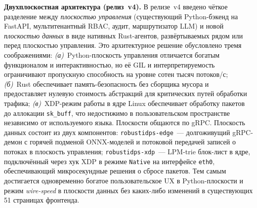 \noindent\textbf{Двухплоскостная архитектура (релиз~v4).} В
релизе~v4 введено чёткое разделение между \emph{плоскостью
управления} (существующий Python-бэкенд на FastAPI,
мультитенантный RBAC, аудит, маршрутизатор LLM) и новой
\emph{плоскостью данных} в виде нативных Rust-агентов,
развёртываемых рядом или перед плоскостью управления. Это
архитектурное решение обусловлено тремя соображениями:
\emph{(а)}~Python-плоскость управления отличается богатым
функционалом и интерактивностью, но её GIL и интерпретируемость
ограничивают пропускную способность на уровне сотен тысяч
потоков/с; \emph{(б)}~Rust обеспечивает память-безопасность без
сборщика мусора и предоставляет нулевую стоимость абстракций для
критических путей обработки трафика; \emph{(в)}~XDP-режим
работы в ядре Linux обеспечивает обработку пакетов до
аллокации \texttt{sk\_buff}, что недостижимо в пользовательском
пространстве независимо от используемого языка. Плоскости
общаются по gRPC. Плоскость данных состоит из двух компонентов:
\texttt{robustidps-edge}~--- долгоживущий gRPC-демон с горячей
подменой ONNX-моделей и потоковой передачей записей о потоках в
плоскость управления; \texttt{robustidps-xdp}~--- LPM-trie блок-лист
в ядре, подключённый через хук XDP в режиме \texttt{Native} на
интерфейсе \texttt{eth0}, обеспечивающий микросекундные решения о
сбросе пакетов. Тем самым достигается одновременно богатое
пользовательское UX в Python-плоскости и режим \emph{wire-speed}
в плоскости данных без каких-либо изменений в существующих 51
страницах фронтенда.

